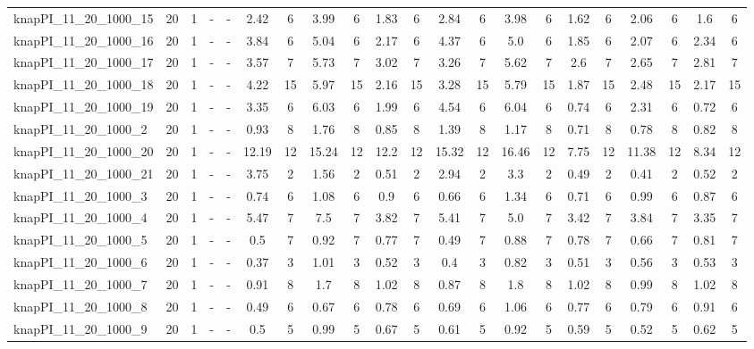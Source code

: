 \begin{sidewaystable}[!ht]
{\begin{tabular}{lcccccccccccccccccccc}
knapPI\_11\_20\_1000\_15 & 20 & 1 &  - &  - & 2.42 & 6 & 3.99 & 6 & 1.83 & 6 & 2.84 & 6 & 3.98 & 6 & 1.62 & 6 & 2.06 & 6 & 1.6 & 6 \\
knapPI\_11\_20\_1000\_16 & 20 & 1 &  - &  - & 3.84 & 6 & 5.04 & 6 & 2.17 & 6 & 4.37 & 6 & 5.0 & 6 & 1.85 & 6 & 2.07 & 6 & 2.34 & 6 \\
knapPI\_11\_20\_1000\_17 & 20 & 1 &  - &  - & 3.57 & 7 & 5.73 & 7 & 3.02 & 7 & 3.26 & 7 & 5.62 & 7 & 2.6 & 7 & 2.65 & 7 & 2.81 & 7 \\
knapPI\_11\_20\_1000\_18 & 20 & 1 &  - &  - & 4.22 & 15 & 5.97 & 15 & 2.16 & 15 & 3.28 & 15 & 5.79 & 15 & 1.87 & 15 & 2.48 & 15 & 2.17 & 15 \\
knapPI\_11\_20\_1000\_19 & 20 & 1 &  - &  - & 3.35 & 6 & 6.03 & 6 & 1.99 & 6 & 4.54 & 6 & 6.04 & 6 & 0.74 & 6 & 2.31 & 6 & 0.72 & 6 \\
knapPI\_11\_20\_1000\_2 & 20 & 1 &  - &  - & 0.93 & 8 & 1.76 & 8 & 0.85 & 8 & 1.39 & 8 & 1.17 & 8 & 0.71 & 8 & 0.78 & 8 & 0.82 & 8 \\
knapPI\_11\_20\_1000\_20 & 20 & 1 &  - &  - & 12.19 & 12 & 15.24 & 12 & 12.2 & 12 & 15.32 & 12 & 16.46 & 12 & 7.75 & 12 & 11.38 & 12 & 8.34 & 12 \\
knapPI\_11\_20\_1000\_21 & 20 & 1 &  - &  - & 3.75 & 2 & 1.56 & 2 & 0.51 & 2 & 2.94 & 2 & 3.3 & 2 & 0.49 & 2 & 0.41 & 2 & 0.52 & 2 \\
knapPI\_11\_20\_1000\_3 & 20 & 1 &  - &  - & 0.74 & 6 & 1.08 & 6 & 0.9 & 6 & 0.66 & 6 & 1.34 & 6 & 0.71 & 6 & 0.99 & 6 & 0.87 & 6 \\
knapPI\_11\_20\_1000\_4 & 20 & 1 &  - &  - & 5.47 & 7 & 7.5 & 7 & 3.82 & 7 & 5.41 & 7 & 5.0 & 7 & 3.42 & 7 & 3.84 & 7 & 3.35 & 7 \\
knapPI\_11\_20\_1000\_5 & 20 & 1 &  - &  - & 0.5 & 7 & 0.92 & 7 & 0.77 & 7 & 0.49 & 7 & 0.88 & 7 & 0.78 & 7 & 0.66 & 7 & 0.81 & 7 \\
knapPI\_11\_20\_1000\_6 & 20 & 1 &  - &  - & 0.37 & 3 & 1.01 & 3 & 0.52 & 3 & 0.4 & 3 & 0.82 & 3 & 0.51 & 3 & 0.56 & 3 & 0.53 & 3 \\
knapPI\_11\_20\_1000\_7 & 20 & 1 &  - &  - & 0.91 & 8 & 1.7 & 8 & 1.02 & 8 & 0.87 & 8 & 1.8 & 8 & 1.02 & 8 & 0.99 & 8 & 1.02 & 8 \\
knapPI\_11\_20\_1000\_8 & 20 & 1 &  - &  - & 0.49 & 6 & 0.67 & 6 & 0.78 & 6 & 0.69 & 6 & 1.06 & 6 & 0.77 & 6 & 0.79 & 6 & 0.91 & 6 \\
knapPI\_11\_20\_1000\_9 & 20 & 1 &  - &  - & 0.5 & 5 & 0.99 & 5 & 0.67 & 5 & 0.61 & 5 & 0.92 & 5 & 0.59 & 5 & 0.52 & 5 & 0.62 & 5 \\

\end{tabular}}
\end{sidewaystable}
